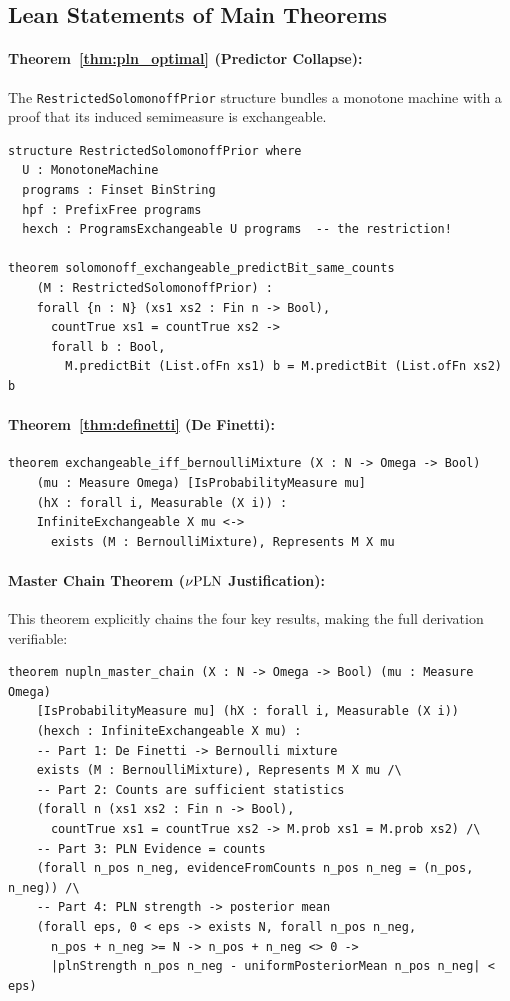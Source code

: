 \documentclass[]{article}
\begin{document}
\subsection{Lean Statements of Main Theorems}

\paragraph{Theorem~\ref{thm:pln_optimal} (Predictor Collapse):}
The \texttt{RestrictedSolomonoffPrior} structure bundles a monotone machine
with a proof that its induced semimeasure is exchangeable.
\begin{lstlisting}[basicstyle=\scriptsize\ttfamily,frame=single,numbers=none]
structure RestrictedSolomonoffPrior where
  U : MonotoneMachine
  programs : Finset BinString
  hpf : PrefixFree programs
  hexch : ProgramsExchangeable U programs  -- the restriction!

theorem solomonoff_exchangeable_predictBit_same_counts
    (M : RestrictedSolomonoffPrior) :
    forall {n : N} (xs1 xs2 : Fin n -> Bool),
      countTrue xs1 = countTrue xs2 ->
      forall b : Bool,
        M.predictBit (List.ofFn xs1) b = M.predictBit (List.ofFn xs2) b
\end{lstlisting}

\paragraph{Theorem~\ref{thm:definetti} (De Finetti):}
\begin{lstlisting}[basicstyle=\scriptsize\ttfamily,frame=single,numbers=none]
theorem exchangeable_iff_bernoulliMixture (X : N -> Omega -> Bool)
    (mu : Measure Omega) [IsProbabilityMeasure mu]
    (hX : forall i, Measurable (X i)) :
    InfiniteExchangeable X mu <->
      exists (M : BernoulliMixture), Represents M X mu
\end{lstlisting}

\paragraph{Master Chain Theorem (\texorpdfstring{$\nu\textup{PLN}$}{nuPLN} Justification):}
This theorem explicitly chains the four key results, making the full
derivation verifiable:
\begin{lstlisting}[basicstyle=\scriptsize\ttfamily,frame=single,numbers=none]
theorem nupln_master_chain (X : N -> Omega -> Bool) (mu : Measure Omega)
    [IsProbabilityMeasure mu] (hX : forall i, Measurable (X i))
    (hexch : InfiniteExchangeable X mu) :
    -- Part 1: De Finetti -> Bernoulli mixture
    exists (M : BernoulliMixture), Represents M X mu /\
    -- Part 2: Counts are sufficient statistics
    (forall n (xs1 xs2 : Fin n -> Bool),
      countTrue xs1 = countTrue xs2 -> M.prob xs1 = M.prob xs2) /\
    -- Part 3: PLN Evidence = counts
    (forall n_pos n_neg, evidenceFromCounts n_pos n_neg = (n_pos, n_neg)) /\
    -- Part 4: PLN strength -> posterior mean
    (forall eps, 0 < eps -> exists N, forall n_pos n_neg,
      n_pos + n_neg >= N -> n_pos + n_neg <> 0 ->
      |plnStrength n_pos n_neg - uniformPosteriorMean n_pos n_neg| < eps)
\end{lstlisting}
\end{document}
